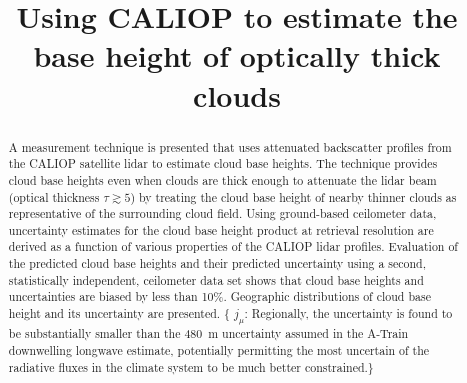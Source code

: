 \documentclass[essd,manuscript]{copernicus}\usepackage[]{graphicx}\usepackage[]{color}
\newcommand{\hlnum}[1]{\textcolor[rgb]{0.686,0.059,0.569}{#1}}%
\newcommand\comment[2]{\{\hlnum{ \textit{#1}: #2}\}}
\newcommand\commentjm[1]{\comment{$j_\mu$}{#1}}
\begin{document}

\title{Using CALIOP to estimate the base height of optically thick clouds}













\received{}
\pubdiscuss{} %
\revised{}
\accepted{}
\published{}




\maketitle



\begin{abstract}
  A measurement technique is presented that uses attenuated backscatter profiles
  from the CALIOP satellite lidar to
  estimate cloud base heights.  The technique provides cloud base heights even
  when clouds are thick enough to attenuate the lidar beam (optical thickness
  $\tau \gtrsim 5$) by treating the cloud base height of nearby thinner clouds as
  representative of the surrounding cloud field.  Using ground-based ceilometer data,
  uncertainty estimates for the cloud base height product at retrieval
  resolution are derived as a function of various properties of the
  CALIOP lidar profiles.  Evaluation of the predicted cloud base heights and
  their predicted uncertainty using a second, statistically independent,
  ceilometer data set shows that cloud base heights and uncertainties are biased
  by less than 10\%.  Geographic distributions of cloud base height and its
  uncertainty are presented.  \commentjm{Regionally, the uncertainty is found to be
  substantially smaller than the 480~m uncertainty assumed in the A-Train
  downwelling longwave estimate, potentially permitting the most uncertain of
  the radiative fluxes in the climate system to be much better constrained.}
\end{abstract}
\end{document}
